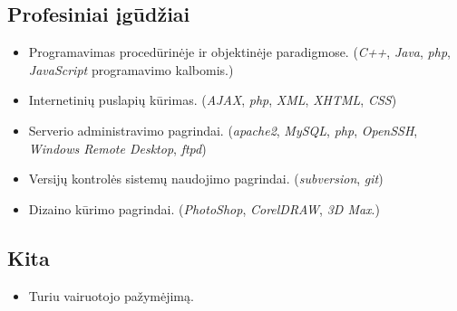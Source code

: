 \subsection{Profesiniai įgūdžiai}

\begin{itemize}
  \item Programavimas procedūrinėje ir objektinėje paradigmose. 
    (\emph{C++}, \emph{Java}, \emph{php}, \emph{JavaScript} 
    programavimo kalbomis.)
  \item Internetinių puslapių kūrimas. (\emph{AJAX}, \emph{php}, 
    \emph{XML}, \emph{XHTML}, \emph{CSS})
  \item Serverio administravimo pagrindai. 
    (\emph{apache2}, \emph{MySQL}, \emph{php}, \emph{OpenSSH}, 
    \emph{Windows Remote Desktop}, \emph{ftpd})
  \item Versijų kontrolės sistemų naudojimo pagrindai. 
    (\emph{subversion}, \emph{git})
  \item Dizaino kūrimo pagrindai. (\emph{PhotoShop}, \emph{CorelDRAW},
    \emph{3D Max}.)
\end{itemize}

\subsection{Kita}

\begin{itemize}
  \item Turiu vairuotojo pažymėjimą.
\end{itemize}

